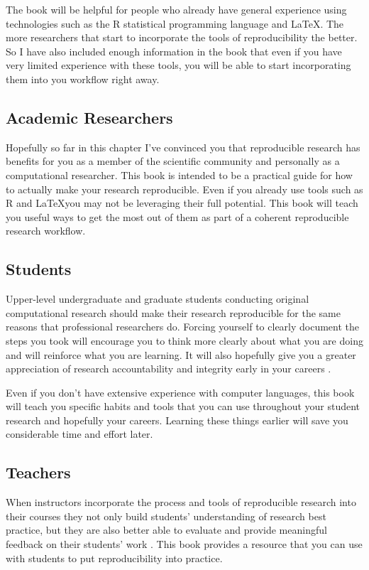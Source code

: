The book will be helpful for people who already have general experience using technologies such as the R statistical programming language and \LaTeX. The more researchers that start to incorporate the tools of reproducibility the better. So I have also included enough information in the book that even if you have very limited experience with these tools, you will be able to start incorporating them into you workflow right away.

\subsection{Academic Researchers}
Hopefully so far in this chapter I've convinced you that reproducible research has benefits for you as a member of the scientific community and personally as a computational researcher. This book is intended to be a practical guide for how to actually make your research reproducible. Even if you already use tools such as R and \LaTeX you may not be leveraging their full potential. This book will teach you useful ways to get the most out of them as part of a coherent reproducible research workflow.

\subsection{Students}
Upper-level undergraduate and graduate students conducting original computational research should make their research reproducible for the same reasons that professional researchers do. Forcing yourself to clearly document the steps you took will encourage you to think more clearly about what you are doing and will reinforce what you are learning. It will also hopefully give you a greater appreciation of research accountability and integrity early in your careers \cite[183]{Barr2012,Ball2012}.

Even if you don't have extensive experience with computer languages, this book will teach you specific habits and tools that you can use throughout your student research and hopefully your careers. Learning these things earlier will save you considerable time and effort later.

\subsection{Teachers}
When instructors incorporate the process and tools of reproducible research into their courses they not only build students' understanding of research best practice, but they are also better able to evaluate and provide meaningful feedback on their students' work \cite[183]{Ball2012}. This book provides a resource that you can use with students to put reproducibility into practice.

